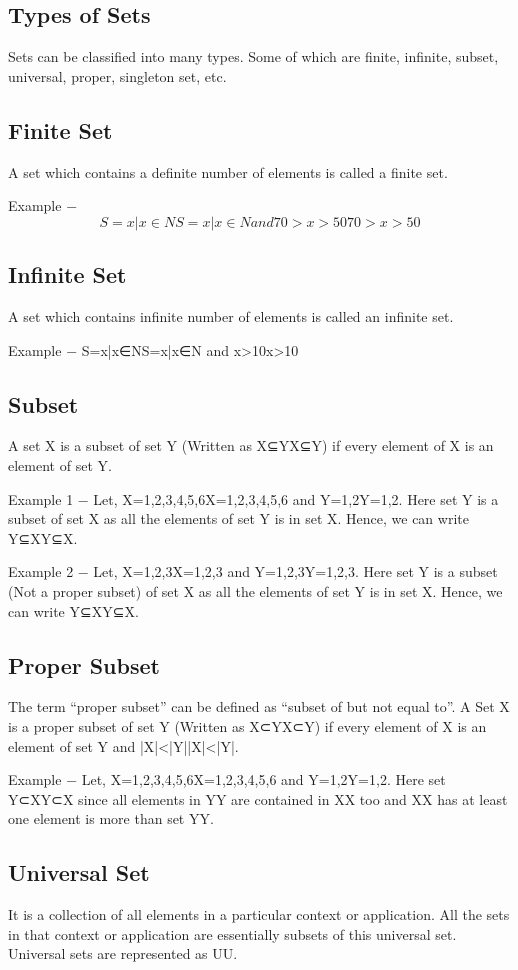 
\subsection{Types of Sets}
Sets can be classified into many types. Some of which are finite, infinite, subset, universal, proper, singleton set, etc.

\subsection{Finite Set}
A set which contains a definite number of elements is called a finite set.

Example − \[S={x|x∈NS={x|x∈N and 70>x>50}70>x>50}\]
\subsection{Infinite Set}
A set which contains infinite number of elements is called an infinite set.

Example − S={x|x∈NS={x|x∈N and x>10}x>10}
\subsection{Subset}
A set X is a subset of set Y (Written as X⊆YX⊆Y) if every element of X is an element of set Y.

Example 1 − Let, X={1,2,3,4,5,6}X={1,2,3,4,5,6} and Y={1,2}Y={1,2}. Here set Y is a subset of set X as all the elements of set Y is in set X. Hence, we can write Y⊆XY⊆X.

Example 2 − Let, X={1,2,3}X={1,2,3} and Y={1,2,3}Y={1,2,3}. Here set Y is a subset (Not a proper subset) of set X as all the elements of set Y is in set X. Hence, we can write Y⊆XY⊆X.

\subsection{Proper Subset}
The term “proper subset” can be defined as “subset of but not equal to”. A Set X is a proper subset of set Y (Written as X⊂YX⊂Y) if every element of X is an element of set Y and |X|<|Y||X|<|Y|.

Example − Let, X={1,2,3,4,5,6}X={1,2,3,4,5,6} and Y={1,2}Y={1,2}. Here set Y⊂XY⊂X since all elements in YY are contained in XX too and XX has at least one element is more than set YY.

\subsection{Universal Set}
It is a collection of all elements in a particular context or application. All the sets in that context or application are essentially subsets of this universal set. Universal sets are represented as UU.

